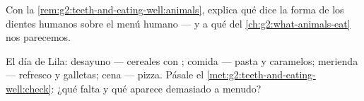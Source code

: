 \begin{exercise}[$\star\star$]\label{exo:g2:teeth-and-eating-well:9}
Con la \cref{rem:g2:teeth-and-eating-well:animals}, explica qué dice
la forma de los dientes humanos sobre el menú humano --- y a qué
 del \cref{ch:g2:what-animals-eat} nos parecemos.
\end{exercise}

\begin{exercise}[$\star\star$]\label{exo:g2:teeth-and-eating-well:10}
El día de Lila: desayuno --- cereales con ; comida --- pasta y
caramelos; merienda --- refresco y galletas; cena --- pizza. Pásale el
\cref{met:g2:teeth-and-eating-well:check}: ¿qué falta y qué aparece
demasiado a menudo?
\end{exercise}
